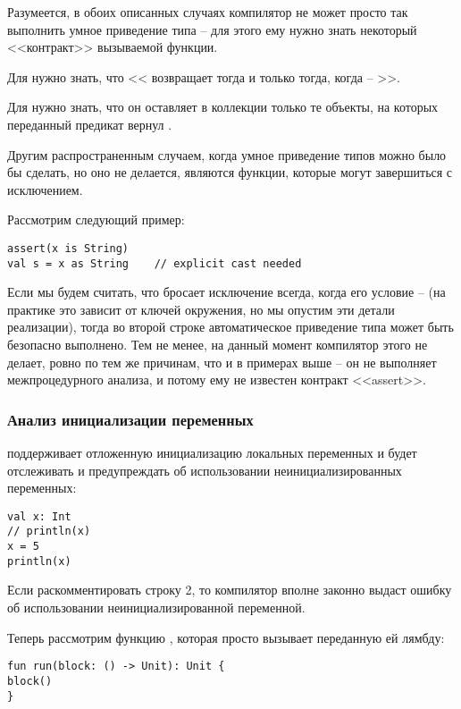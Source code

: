 Разумеется, в обоих описанных случаях компилятор не может просто так выполнить умное приведение типа -- для этого ему нужно знать некоторый <<контракт>> вызываемой функции. 

Для  нужно знать, что << возвращает  тогда и только тогда, когда  -- >>. 

Для  нужно знать, что он оставляет в коллекции только те объекты, на которых переданный предикат вернул .


\bigskip

Другим распространенным случаем, когда умное приведение типов можно было бы сделать, но оно не делается, являются функции, которые могут завершиться с исключением. 

Рассмотрим следующий пример:

\begin{verbatim}
assert(x is String)
val s = x as String    // explicit cast needed
\end{verbatim}

Если мы будем считать, что  бросает исключение всегда, когда его условие --  (на практике это зависит от ключей окружения, но мы опустим эти детали реализации), тогда во второй строке автоматическое приведение типа может быть безопасно выполнено. Тем не менее, на данный момент компилятор  этого не делает, ровно по тем же причинам, что и в примерах выше -- он не выполняет межпроцедурного анализа, и потому ему не известен контракт <<assert>>. 




\subsubsection{Анализ инициализации переменных}

 поддерживает отложенную инициализацию локальных переменных и будет отслеживать и предупреждать об использовании неинициализированных переменных:

\begin{verbatim}
val x: Int
// println(x)
x = 5
println(x)
\end{verbatim}

Если раскомментировать строку 2, то компилятор вполне законно выдаст ошибку об использовании неинициализированной переменной. 

Теперь рассмотрим функцию , которая просто вызывает переданную ей лямбду: 
\begin{verbatim}
fun run(block: () -> Unit): Unit {
block()
}
\end{verbatim}

